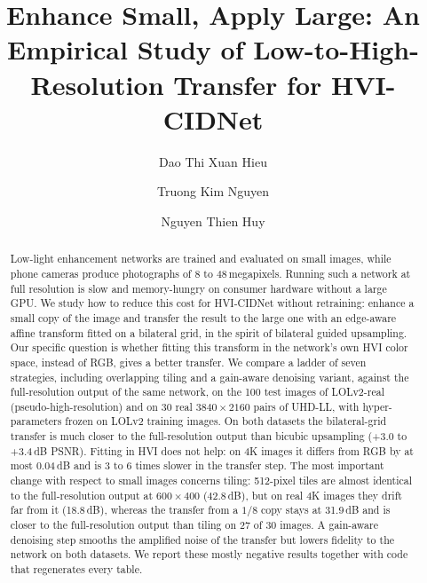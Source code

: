 \documentclass[runningheads]{llncs}
\begin{document}
\setlength{\emergencystretch}{3em}

\title{Enhance Small, Apply Large: An Empirical Study of Low-to-High-Resolution Transfer for HVI-CIDNet}

\author{Dao Thi Xuan Hieu \and Truong Kim Nguyen \and Nguyen Thien Huy}

\maketitle

\begin{abstract}
Low-light enhancement networks are trained and evaluated on small images, while phone cameras produce photographs of 8 to 48\,megapixels. Running such a network at full resolution is slow and memory-hungry on consumer hardware without a large GPU. We study how to reduce this cost for HVI-CIDNet without retraining: enhance a small copy of the image and transfer the result to the large one with an edge-aware affine transform fitted on a bilateral grid, in the spirit of bilateral guided upsampling. Our specific question is whether fitting this transform in the network's own HVI color space, instead of RGB, gives a better transfer. We compare a ladder of seven strategies, including overlapping tiling and a gain-aware denoising variant, against the full-resolution output of the same network, on the 100 test images of LOLv2-real (pseudo-high-resolution) and on 30 real $3840{\times}2160$ pairs of UHD-LL, with hyper-parameters frozen on LOLv2 training images. On both datasets the bilateral-grid transfer is much closer to the full-resolution output than bicubic upsampling (+3.0 to +3.4\,dB PSNR). Fitting in HVI does not help: on 4K images it differs from RGB by at most 0.04\,dB and is 3 to 6 times slower in the transfer step. The most important change with respect to small images concerns tiling: 512-pixel tiles are almost identical to the full-resolution output at $600{\times}400$ (42.8\,dB), but on real 4K images they drift far from it (18.8\,dB), whereas the transfer from a $1/8$ copy stays at 31.9\,dB and is closer to the full-resolution output than tiling on 27 of 30 images. A gain-aware denoising step smooths the amplified noise of the transfer but lowers fidelity to the network on both datasets. We report these mostly negative results together with code that regenerates every table.
\end{abstract}
\end{document}
